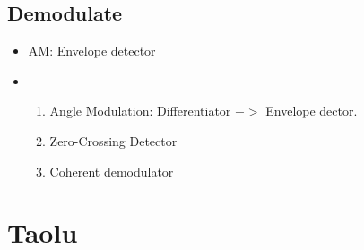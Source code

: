 \documentclass{article}
\begin{document}
    \subsection{Demodulate}
        \begin{itemize}
         \item AM: Envelope detector
         \item  \begin{enumerate}\item Angle Modulation: Differentiator $->$ Envelope dector.  \item Zero-Crossing Detector \item Coherent demodulator \end{enumerate}

        \end{itemize}
     \section{Taolu}
\end{document}
